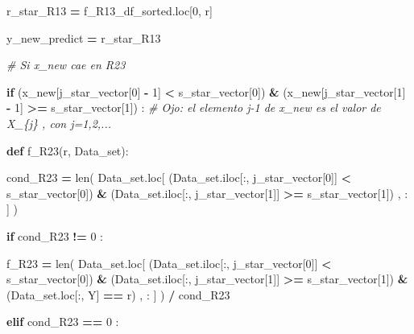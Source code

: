\documentclass[
  11pt,
  a4paper,
]{article}
\newenvironment{Shaded}{\begin{snugshade}}{\end{snugshade}}
\newcommand{\BuiltInTok}[1]{#1}
\newcommand{\CommentTok}[1]{\textcolor[rgb]{0.56,0.35,0.01}{\textit{#1}}}
\newcommand{\ControlFlowTok}[1]{\textcolor[rgb]{0.13,0.29,0.53}{\textbf{#1}}}
\newcommand{\DecValTok}[1]{\textcolor[rgb]{0.00,0.00,0.81}{#1}}
\newcommand{\KeywordTok}[1]{\textcolor[rgb]{0.13,0.29,0.53}{\textbf{#1}}}
\newcommand{\NormalTok}[1]{#1}
\newcommand{\OperatorTok}[1]{\textcolor[rgb]{0.81,0.36,0.00}{\textbf{#1}}}
\newcommand{\StringTok}[1]{\textcolor[rgb]{0.31,0.60,0.02}{#1}}
\begin{document}
\begin{Shaded}
\begin{Highlighting}[]
\NormalTok{                r\_star\_R13 }\OperatorTok{=}\NormalTok{ f\_R13\_df\_sorted.loc[}\DecValTok{0}\NormalTok{, }\StringTok{\textquotesingle{}r\textquotesingle{}}\NormalTok{]}


\NormalTok{                y\_new\_predict }\OperatorTok{=}\NormalTok{ r\_star\_R13}



        \CommentTok{\# Si x\_new cae en R23}


            \ControlFlowTok{if}\NormalTok{ (x\_new[j\_star\_vector[}\DecValTok{0}\NormalTok{] }\OperatorTok{{-}} \DecValTok{1}\NormalTok{] }\OperatorTok{\textless{}}\NormalTok{ s\_star\_vector[}\DecValTok{0}\NormalTok{]) }\OperatorTok{\&}\NormalTok{ (x\_new[j\_star\_vector[}\DecValTok{1}\NormalTok{] }\OperatorTok{{-}} \DecValTok{1}\NormalTok{] }\OperatorTok{\textgreater{}=}\NormalTok{ s\_star\_vector[}\DecValTok{1}\NormalTok{]) :  }\CommentTok{\# Ojo: el elemento j{-}1 de x\_new es el valor de X\_\{j\} , con j=1,2,...}

                
                \KeywordTok{def}\NormalTok{ f\_R23(r, Data\_set):}

\NormalTok{                    cond\_R23 }\OperatorTok{=} \BuiltInTok{len}\NormalTok{( Data\_set.loc[ (Data\_set.iloc[:, j\_star\_vector[}\DecValTok{0}\NormalTok{]] }\OperatorTok{\textless{}}\NormalTok{ s\_star\_vector[}\DecValTok{0}\NormalTok{]) }\OperatorTok{\&}\NormalTok{ (Data\_set.iloc[:, j\_star\_vector[}\DecValTok{1}\NormalTok{]] }\OperatorTok{\textgreater{}=}\NormalTok{ s\_star\_vector[}\DecValTok{1}\NormalTok{]) , : ] ) }

                    \ControlFlowTok{if}\NormalTok{  cond\_R23 }\OperatorTok{!=} \DecValTok{0}\NormalTok{ :}

\NormalTok{                        f\_R23 }\OperatorTok{=} \BuiltInTok{len}\NormalTok{( Data\_set.loc[ (Data\_set.iloc[:, j\_star\_vector[}\DecValTok{0}\NormalTok{]] }\OperatorTok{\textless{}}\NormalTok{ s\_star\_vector[}\DecValTok{0}\NormalTok{]) }\OperatorTok{\&}\NormalTok{ (Data\_set.iloc[:, j\_star\_vector[}\DecValTok{1}\NormalTok{]] }\OperatorTok{\textgreater{}=}\NormalTok{ s\_star\_vector[}\DecValTok{1}\NormalTok{]) }\OperatorTok{\&}\NormalTok{ (Data\_set.loc[:, }\StringTok{\textquotesingle{}Y\textquotesingle{}}\NormalTok{] }\OperatorTok{==}\NormalTok{ r) , : ] ) }\OperatorTok{/}\NormalTok{ cond\_R23}

                    \ControlFlowTok{elif}\NormalTok{ cond\_R23 }\OperatorTok{==} \DecValTok{0}\NormalTok{ :}


\end{Highlighting}
\end{Shaded}
\end{document}
